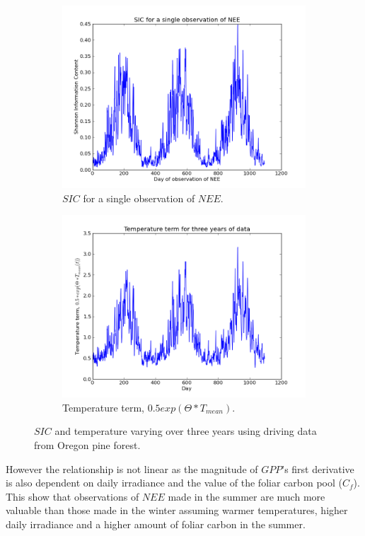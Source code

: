 \documentclass[11pt]{article}
\begin{document}
\begin{figure}[h]
\centering
\begin{subfigure}{.5\textwidth}
  \centering
  \includegraphics[width=.9\linewidth]{SIC1Obs_0_1095.png}
  \caption{$SIC$ for a single observation of $NEE$.}
  \label{fig:sub1}
\end{subfigure}%
\begin{subfigure}{.5\textwidth}
  \centering
  \includegraphics[width=.9\linewidth]{Temp_0_1095.png}
  \caption{Temperature term, $0.5exp(\Theta * T_{mean})$.}
  \label{fig:sub2}
\end{subfigure}
\caption{$SIC$ and temperature varying over three years using driving data from Oregon pine forest.}
\label{fig:SICNEET}
\end{figure}

However the relationship is not linear as the magnitude of $GPP$'s first derivative is also dependent on daily irradiance and the value of the foliar carbon pool ($C_f$). This show that observations of $NEE$ made in the summer are much more valuable than those made in the winter assuming warmer temperatures, higher daily irradiance and a higher amount of foliar carbon in the summer.
\end{document}
